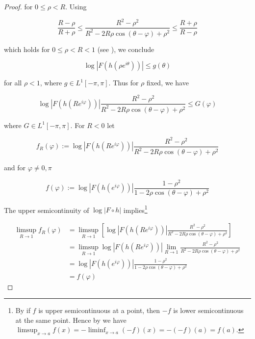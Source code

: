 \begin{proof}
for $0 \leqslant \rho < R$. Using 

\begin{equation*}
	\frac{R - \rho}{R + \rho} \leqslant \frac{R^2 - \rho^2}{R^2 - 2R\rho\cos(\theta - \varphi) + \rho^2} \leqslant \frac{R + \rho}{R - \rho}
\end{equation*}

which holds for $0 \leqslant \rho < R < 1$ (see \cite[236]{rudin:rc_analysis:1987}), we conclude

\begin{equation*}
	\log\left| F(h(\rho e^{i\theta}))\right| \leqslant g(\theta)
\end{equation*}

for all $\rho < 1$, where $g \in L^1[-\pi,\pi]$. Thus for $\rho$ fixed, we have 

\begin{equation*}
	\log\left| F(h(Re^{i\varphi}))\right| \frac{R^2 - \rho^2}{R^2 - 2R\rho\cos(\theta - \varphi) + \rho^2} \leqslant G(\varphi)
\end{equation*}

where $G \in L^1[-\pi,\pi]$. For $R < 0$ let

\begin{equation*}
	f_R(\varphi) := \log\left| F(h(Re^{i\varphi}))\right| \frac{R^2 - \rho^2}{R^2 - 2R\rho\cos(\theta - \varphi) + \rho^2}
\end{equation*}

and for $\varphi \neq 0,\pi$

\begin{equation*}
	f(\varphi) := \log\left| F(h(e^{i\varphi}))\right| \frac{1 - \rho^2}{1 - 2\rho\cos(\theta - \varphi) + \rho^2}
\end{equation*}

The upper semicontinuity of $\log\left| F \circ h\right|$ implies\footnote{
	By \cite[360]{bourbaki:general_topology:1995} if $f$ is upper semicontinuous at a point, then $-f$ is lower semicontinuous at the same point. Hence by \cite[363]{bourbaki:general_topology:1995} we have $\limsup_{x \to a} f(x) = -\liminf_{x \to a}\left( -f \right)(x) = -\left( -f \right)(a) = f(a)$.
}

\begin{equation*}
	\begin{aligned}
		\limsup_{R \to 1}f_R(\varphi) &= \limsup_{R \to 1} \left[ \log\left| F(h(Re^{i\varphi}))\right| \frac{R^2 - \rho^2}{R^2 - 2R\rho\cos(\theta - \varphi) + \rho^2}\right]\\
		&= \limsup_{R \to 1} \log\left| F(h(Re^{i\varphi}))\right| \lim_{R \to 1} \frac{R^2 - \rho^2}{R^2 - 2R\rho\cos(\theta - \varphi) + \rho^2}\\
		&= \log\left| F(h(e^{i\varphi}))\right| \frac{1 - \rho^2}{1 - 2\rho\cos(\theta - \varphi) + \rho^2}\\
		&= f(\varphi)
	\end{aligned}
\end{equation*}


\end{proof}
